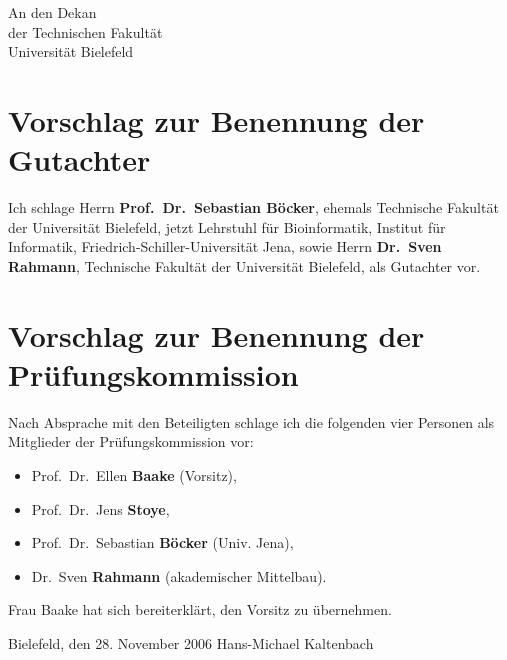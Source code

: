 \documentclass[11pt,a4paper]{article}
\begin{document}
\pagestyle{empty}
\noindent
An den Dekan\\
der Technischen Fakult\"at\\
Universit\"at Bielefeld

\vspace{2cm}

\section*{Vorschlag zur Benennung der Gutachter}
Ich schlage Herrn \textbf{Prof.\ Dr.\ Sebastian B\"ocker}, ehemals Technische Fakult\"at der Universit\"at Bielefeld, jetzt Lehrstuhl f\"ur Bioinformatik, Institut f\"ur Informatik,
Friedrich-Schiller-Universit\"at Jena, sowie Herrn \textbf{Dr.\ Sven Rahmann}, Technische Fakult\"at
der  Universit\"at Bielefeld, als Gutachter vor.

\section*{Vorschlag zur Benennung der Pr\"ufungskommission}
Nach Absprache mit den Beteiligten schlage ich die folgenden vier Personen als Mitglieder der
Pr\"ufungskommission vor:
\begin{itemize}
  \item Prof.\ Dr.\ Ellen \textbf{Baake} (Vorsitz),
  \item Prof.\ Dr.\ Jens \textbf{Stoye},
  \item Prof.\ Dr.\ Sebastian \textbf{B\"ocker} (Univ. Jena),
  \item Dr.\ Sven \textbf{Rahmann} (akademischer Mittelbau).
\end{itemize}
Frau Baake hat sich bereiterkl\"art, den Vorsitz zu \"ubernehmen.

\vspace{4cm}
\noindent Bielefeld, den 28. November 2006 \hfill Hans-Michael Kaltenbach
\end{document}
